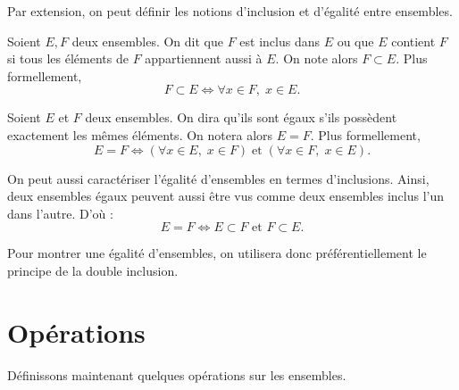Par extension, on peut définir les notions d'inclusion et d'égalité entre ensembles. 

\begin{definition}[Inclusion]
    Soient $E, F$ deux ensembles. On dit que $F$ est inclus dans $E$ ou que $E$ contient $F$ 
    si tous les éléments de $F$ appartiennent aussi à $E$. On note alors $F \subset E$. 
    Plus formellement, 
        \[ F \subset E \iff \forall x \in F, \; x \in E. \] 
\end{definition}

\begin{definition}[Égalité]
    Soient $E$ et $F$ deux ensembles. On dira qu'ils sont égaux s’ils possèdent 
    exactement les mêmes éléments. On notera alors $E = F$.
    Plus formellement, 
        \[ E = F \iff (\forall x \in E, \; x \in F) \; \text{et} \; (\forall x \in F, \; x \in E). \] 
\end{definition}

\begin{proposition}
    On peut aussi caractériser l'égalité d'ensembles en termes d'inclusions. 
    Ainsi, deux ensembles égaux peuvent aussi être vus comme deux ensembles inclus l'un dans l'autre. 
    D'où : 
        \[ E = F \iff E \subset F \text{ et } F \subset E. \]     
\end{proposition}

Pour montrer une égalité d'ensembles, on utilisera donc préférentiellement le principe de la 
double inclusion. 


\section{Opérations}

Définissons maintenant quelques opérations sur les ensembles. 

